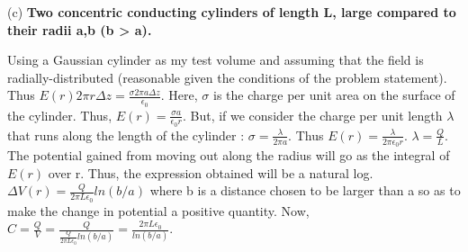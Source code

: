 \begin{homeworkProblem}
\begin{homeworkSection}{(c)}
\textbf{Two concentric conducting cylinders of length L, large compared to their radii a,b (b > a). }

Using a Gaussian cylinder as my test volume and assuming that the field is radially-distributed (reasonable given the conditions of the problem statement). Thus $E(r) 2 \pi r \Delta z = \frac{\sigma 2 \pi a \Delta z}{\epsilon_0}$. Here, $\sigma$ is the charge per unit area on the surface of the cylinder. Thus, $E(r) = \frac{\sigma a}{\epsilon_0 r}$. But, if we consider the charge per unit length $\lambda$ that runs along the length of the cylinder : $\sigma = \frac{\lambda}{2 \pi a}$. Thus $E(r) = \frac{\lambda}{2\pi \epsilon_0 r}$. $\lambda = \frac{Q}{L}$. The potential gained from moving out along the radius will go as the integral of $E(r)$ over r. Thus, the expression obtained will be a natural log. $\Delta V(r) = \frac{Q}{2\pi L \epsilon_0} ln(b/a)$ where b is a distance chosen to be larger than a so as to make the change in potential a positive quantity. Now, $C = \frac{Q}{V} = \frac{Q}{\frac{Q}{2\pi L \epsilon_0} ln(b/a)} = \frac{2 \pi L \epsilon_0}{ln(b/a)}$. 

\end{homeworkSection}


\end{homeworkProblem}